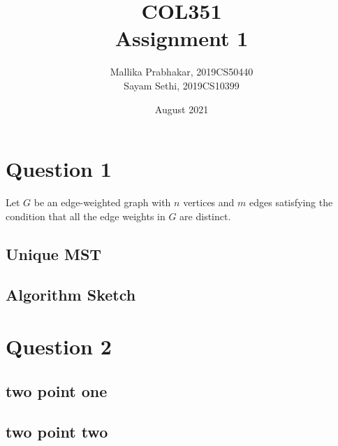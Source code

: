 \documentclass[12pt]{article}
\title{COL351 \\ Assignment 1}
\author{Mallika Prabhakar, 2019CS50440 \\ Sayam Sethi, 2019CS10399}
\date{August 2021}
\begin{document}

\maketitle
\tableofcontents
{}


\section{Question 1}

Let $G$ be an edge-weighted graph with $n$ vertices and $m$ edges satisfying the condition that all the edge weights in $G$ are distinct.

\subsection{Unique MST}


\subsection{Algorithm Sketch}



\section{Question 2}


\subsection{two point one}


\subsection{two point two}

\end{document}
